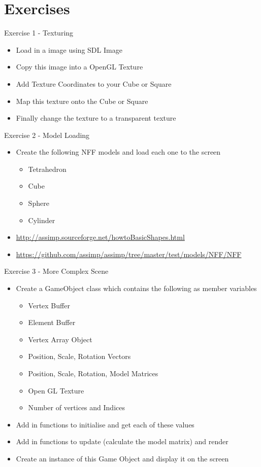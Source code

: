 \part{Exercises}
\frame{\partpage}

\begin{frame}{Exercise 1 - Texturing}
	\begin{itemize}
		\item Load in a image using SDL Image
		\item Copy this image into a OpenGL Texture
		\item Add Texture Coordinates to your Cube or Square
		\item Map this texture onto the Cube or Square
		\item Finally change the texture to a transparent texture
	\end{itemize}
\end{frame}

\begin{frame}{Exercise 2 - Model Loading}
	\begin{itemize}
		\item Create the following NFF models and load each one to the screen
		\begin{itemize}
			\item Tetrahedron 
			\item Cube
			\item Sphere
			\item Cylinder
		\end{itemize}
		\item \url{http://assimp.sourceforge.net/howtoBasicShapes.html}
		\item \url{https://github.com/assimp/assimp/tree/master/test/models/NFF/NFF}
	\end{itemize}
\end{frame}

\begin{frame}{Exercise 3 - More Complex Scene}
	\begin{itemize}
		\item Create a GameObject class which contains the following as member variables
		\begin{itemize}
			\item Vertex Buffer
			\item Element Buffer
			\item Vertex Array Object
			\item Position, Scale, Rotation Vectors
			\item Position, Scale, Rotation, Model Matrices
			\item Open GL Texture
			\item Number of vertices and Indices
		\end{itemize}
		\item Add in functions to initialise and get each of these values
		\item Add in functions to update (calculate the model matrix) and render
		\item Create an instance of this Game Object and display it on the screen
	\end{itemize}
\end{frame}